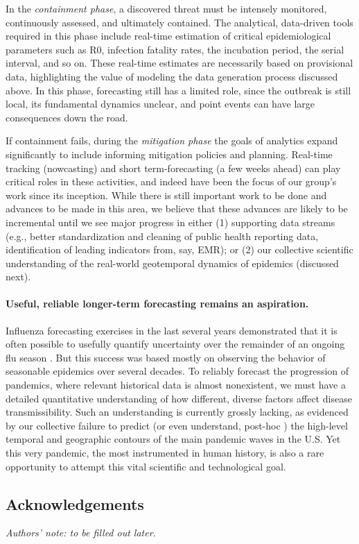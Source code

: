 \documentclass{article}
\begin{document}
In the \emph{containment phase}, a discovered threat must be intensely
monitored, continuously assessed, and ultimately contained.  The analytical,
data-driven tools required in this phase include real-time estimation of
critical epidemiological parameters such as R0, infection fatality rates, the
incubation period, the serial interval, and so on.  These real-time estimates
are necessarily based on provisional data, highlighting the value of modeling
the data generation process discussed above.  In this phase, forecasting still
has a limited role, since the outbreak is still local, its fundamental dynamics
unclear, and point events can have large consequences down the road. 

If containment fails, during the \emph{mitigation phase} the goals of analytics
expand significantly to include informing mitigation policies and planning.
Real-time tracking (nowcasting) and short term-forecasting (a few weeks
ahead) can play critical roles in these activities, and indeed have been the
focus of our group's work since its inception.  While there is still important
work to be done and advances to be made in this area, we believe that these
advances are likely to be incremental until we see major progress in either (1)
supporting data streams (e.g., better standardization and cleaning of public
health reporting data, identification of leading indicators from, say, EMR); or
(2) our collective scientific understanding of the real-world geotemporal
dynamics of epidemics (discussed next).

\paragraph{Useful, reliable longer-term forecasting remains an aspiration.}

Influenza forecasting exercises in the last several years demonstrated that it
is often possible to usefully quantify uncertainty over the remainder of an
ongoing flu season \citep{Reich:2019}.  But this success was based mostly on
observing the behavior of seasonable epidemics over several decades.  To
reliably forecast the progression of pandemics, where relevant historical data
is almost nonexistent, we must have a detailed quantitative understanding of how
different, diverse factors affect disease transmissibility.  Such an 
understanding is currently grossly lacking, as evidenced by our collective
failure to predict \citep{Reich:2021} (or even understand, post-hoc
\citep{Hawre:2021}) the high-level temporal and geographic contours of the main
pandemic waves in the U.S.  Yet this very pandemic, the most instrumented in
human history, is also a rare opportunity to attempt this vital scientific and
technological goal.

\subsection*{Acknowledgements} 

\emph{Authors' note: to be filled out later.}

\newpage


\end{document}
